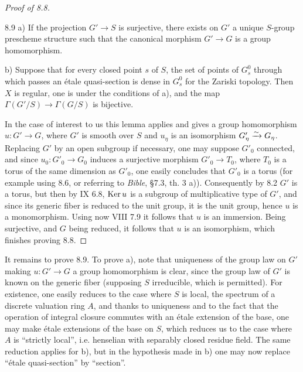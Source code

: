 \begin{proof}[Proof of 8.8]
\begin{lemma}{8.9}
a) If the projection $G'\to S$ is surjective, there exists on $G'$ a unique $S$-group prescheme structure such that the canonical morphism $G'\to G$ is a group homomorphism.

b) Suppose that for every closed point $s$ of $S$, the set of points of $G_s^0$ through which passes an étale quasi-section is dense in $G_s^0$ for the Zariski topology. Then $X$ is regular, one is under the conditions of a), and the map $\Gamma(G'/S)\to\Gamma(G/S)$ is bijective.
\end{lemma}
In the case of interest to us this lemma applies and gives a group homomorphism $u:G'\to G$, where $G'$ is smooth over $S$ and $u_\eta$ is an isomorphism $G'_\eta\xrightarrow{\sim} G_\eta$. Replacing $G'$ by an open subgroup if necessary, one may suppose $G'_0$ connected, and since $u_0:G'_0\to G_0$ induces a surjective morphism $G'_0\to T_0$, where $T_0$ is a torus of the same dimension as $G'_0$, one easily concludes that $G'_0$ is a torus (for example using 8.6, or referring to \emph{Bible}, \S7.3, th. 3 a)). Consequently by 8.2 $G'$ is a torus, but then by IX 6.8, $\operatorname{Ker} u$ is a subgroup of multiplicative type of $G'$, and since its generic fiber is reduced to the unit group, it is the unit group, hence $u$ is a monomorphism. Using now VIII 7.9 it follows that $u$ is an immersion. Being surjective, and $G$ being reduced, it follows that $u$ is an isomorphism, which finishes proving 8.8.
\end{proof}
It remains to prove 8.9. To prove a), note that uniqueness of the group law on $G'$ making $u:G'\to G$ a group homomorphism is clear, since the group law of $G'$ is known on the generic fiber (supposing $S$ irreducible, which is permitted). For existence, one easily reduces to the case where $S$ is local, the spectrum of a discrete valuation ring $A$, and thanks to uniqueness and to the fact that the operation of integral closure commutes with an étale extension of the base, one may make étale extensions of the base on $S$, which reduces us to the case where $A$ is ``strictly local'', i.e. henselian with separably closed residue field. The same reduction applies for b), but in the hypothesis made in b) one may now replace ``étale quasi-section'' by ``section''.


